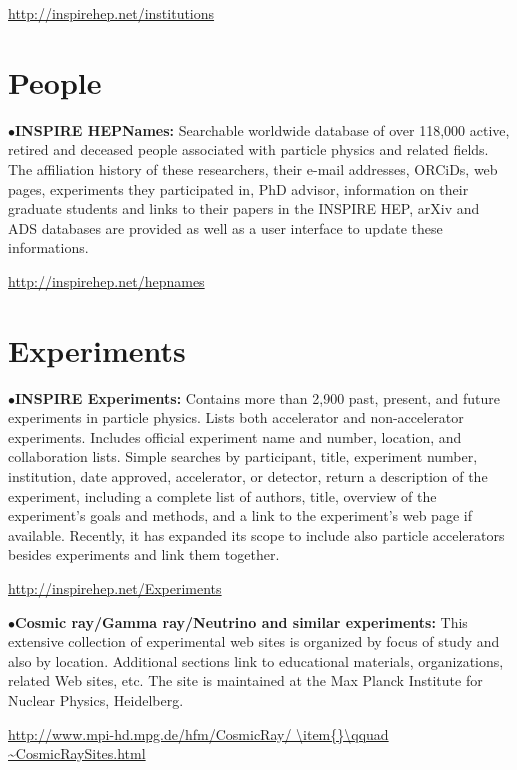 	\item{}\qquad\url{http://inspirehep.net/institutions}


\section{People} %


\item{$\bullet$}{\bf INSPIRE HEPNames:} 
Searchable worldwide database of over 118,000 active, retired and deceased people associated with particle physics and related fields. The affiliation history of these researchers, their e-mail addresses, ORCiDs, web pages, experiments they participated in, PhD advisor, information on their graduate students and links to their papers in the INSPIRE HEP, arXiv and ADS databases are provided as well as a user interface to update these informations.

	\item{}\qquad\url{http://inspirehep.net/hepnames}



\section{Experiments}  %

\item{$\bullet$}{\bf INSPIRE Experiments:} 
Contains more than 2,900 past, present, and future experiments in particle physics. Lists both accelerator and non-accelerator experiments. Includes official experiment name and number, location, and collaboration lists. Simple searches by participant, title, experiment number, institution, date approved, accelerator, or detector, return a description of the experiment, including a complete list of authors, title, overview of the experiment's goals and methods, and a link to the experiment's web page if available.
Recently, it has expanded its scope to include also particle accelerators besides experiments and link them together.
 
	\item{}\qquad\url{http://inspirehep.net/Experiments}

\medskip

\item{$\bullet$}{\bf Cosmic ray/Gamma ray/Neutrino and similar experiments:} 
This extensive collection of experimental web sites is organized by focus of study and also by location. Additional sections link to educational materials, organizations, related Web sites, etc. The site is maintained at the Max Planck Institute for Nuclear Physics, Heidelberg.
	\item{}\qquad\url{http://www.mpi-hd.mpg.de/hfm/CosmicRay/
\item{}\qquad ~CosmicRaySites.html}

